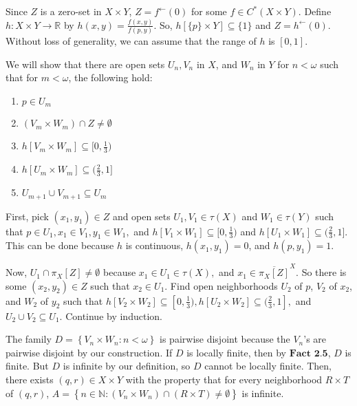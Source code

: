 \documentclass{article}
\begin{document}
		  \vskip 15pt

		  Since $Z$ is a zero-set in $X\times Y$, $Z=f^\leftarrow (0)$ for some $f\in C^*(X\times Y).$ Define $h: X\times Y\rightarrow \mathbb{R}$ by $h(x,y)=\frac{f(x,y)}{f(p,y)}$. So, $h\left[\{p\}\times Y\right] \subseteq \{1\}$ and $Z=h^\leftarrow (0).$ Without loss of generality, we can assume that the range of $h$ is $[0,1]$. 
		  \vskip 10pt

		  We will show that there are open sets $U_n, V_n$ in $X$, and $W_n$ in $Y$ for $n<\omega$ such that for $m<\omega$, the following hold: 

		  \begin{enumerate}
		  \item $p\in U_m$
		  \item $(V_m\times W_m)\cap Z \neq \emptyset$
		  \item $h\left[V_m\times W_m\right] \subseteq [0,\frac{1}{3})$
		  \item $h\left[U_m\times W_m\right] \subseteq (\frac{2}{3},1]$
			  \item $U_{m+1}\cup V_{m+1}\subseteq U_m$
			  \end{enumerate}

			  \vskip 5pt

			  First, pick $(x_1,y_1)\in Z$ and open sets $U_1,V_1\in \tau(X)$ and $W_1\in \tau(Y)$ such that $p\in U_1, x_1\in V_1, y_1\in W_1,$ and $h\left[V_1\times W_1\right] \subseteq [0,\frac{1}{3})$ and $h\left[U_1\times W_1\right] \subseteq (\frac{2}{3}, 1]$. This can be done because $h$ is continuous, $h(x_1,y_1)=0$, and $h(p,y_1)=1$.

			  \vskip 10pt

			  Now, $U_1\cap \pi_X[Z]\neq \emptyset$ because $x_1\in U_1\in \tau(X), $ and $x_1\in \overline{\pi_X[Z]}^X.$ So there is some $(x_2,y_2)\in Z$ such that $x_2\in U_1$. Find open neighborhoods $U_2$ of $p$, $V_2$ of $x_2$, and $W_2$ of $y_2$ such that $h\left[V_2\times W_2\right] \subseteq [0,\frac{1}{3}), h\left[U_2\times W_2\right]\subseteq (\frac{2}{3},1],$ and $U_2\cup V_2\subseteq U_1$. Continue by induction. 


			  \vskip 20pt
			  The family $D=\left\{V_n\times W_n: n<\omega\right\}$ is pairwise disjoint because the $V_n$'s are pairwise disjoint by our construction. If $D$ is locally finite, then by $\textbf{Fact 2.5}$, $D$ is finite. But $D$ is infinite by our definition, so $D$ cannot be locally finite. Then, there exists $(q,r)\in X\times Y$ with the property that for every neighborhood $R\times T$ of $(q,r)$, $A=\left\{n\in \mathbb{N}: (V_n\times W_n)\cap (R\times T) \neq \emptyset\right\}$ is infinite. 
			  \vskip 20pt
\end{document}
